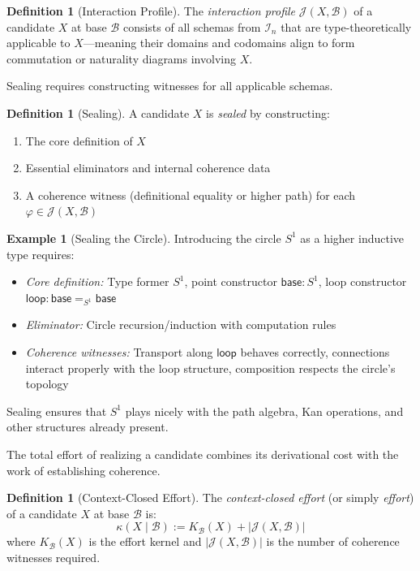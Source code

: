 \documentclass[11pt]{article}
\theoremstyle{definition}
\newtheorem{definition}[theorem]{Definition}
\newtheorem{example}[theorem]{Example}
\theoremstyle{remark}
\begin{document}
\begin{definition}[Interaction Profile]
\label{def:interaction-profile}
The \emph{interaction profile} $\mathcal{J}(X, \mathcal{B})$ of a candidate $X$ at base $\mathcal{B}$ consists of all schemas from $\mathcal{I}_n$ that are type-theoretically applicable to $X$---meaning their domains and codomains align to form commutation or naturality diagrams involving $X$.
\end{definition}

Sealing requires constructing witnesses for all applicable schemas.

\begin{definition}[Sealing]
\label{def:sealing}
A candidate $X$ is \emph{sealed} by constructing:
\begin{enumerate}
\item The core definition of $X$
\item Essential eliminators and internal coherence data
\item A coherence witness (definitional equality or higher path) for each $\varphi \in \mathcal{J}(X, \mathcal{B})$
\end{enumerate}
\end{definition}

\begin{example}[Sealing the Circle]
Introducing the circle $S^1$ as a higher inductive type requires:
\begin{itemize}
\item \emph{Core definition:} Type former $S^1$, point constructor $\mathsf{base} : S^1$, loop constructor $\mathsf{loop} : \mathsf{base} =_{S^1} \mathsf{base}$
\item \emph{Eliminator:} Circle recursion/induction with computation rules
\item \emph{Coherence witnesses:} Transport along $\mathsf{loop}$ behaves correctly, connections interact properly with the loop structure, composition respects the circle's topology
\end{itemize}
Sealing ensures that $S^1$ plays nicely with the path algebra, Kan operations, and other structures already present.
\end{example}

The total effort of realizing a candidate combines its derivational cost with the work of establishing coherence.

\begin{definition}[Context-Closed Effort]
\label{def:context-closed-effort}
The \emph{context-closed effort} (or simply \emph{effort}) of a candidate $X$ at base $\mathcal{B}$ is:
\[
\kappa(X \mid \mathcal{B}) := K_{\mathcal{B}}(X) + |\mathcal{J}(X, \mathcal{B})|
\]
where $K_{\mathcal{B}}(X)$ is the effort kernel and $|\mathcal{J}(X, \mathcal{B})|$ is the number of coherence witnesses required.
\end{definition}
\end{document}
